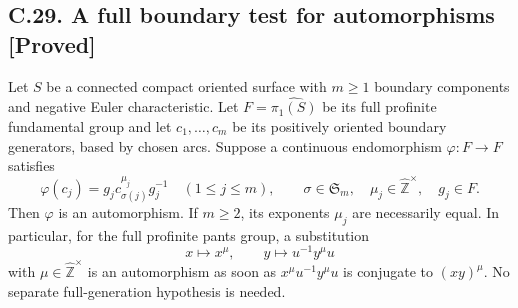 \documentclass[11pt]{article}
\newcommand{\statement}[3]{\subsection*{#1. #3 [#2]}}
\begin{document}
\statement{C.29}{Proved}{A full boundary test for automorphisms}
Let $S$ be a connected compact oriented surface with $m\geq1$ boundary components and negative Euler characteristic. Let $F=\widehat{\pi_1(S)}$ be its full profinite fundamental group and let $c_1,\ldots,c_m$ be its positively oriented boundary generators, based by chosen arcs. Suppose a continuous endomorphism $\varphi:F\to F$ satisfies
\[
 \varphi(c_j)=g_jc_{\sigma(j)}^{\mu_j}g_j^{-1}
 \quad(1\leq j\leq m),
 \qquad \sigma\in\mathfrak S_m,\quad
 \mu_j\in\widehat{\mathbb Z}^{\times},\quad g_j\in F.
\]
Then $\varphi$ is an automorphism. If $m\geq2$, its exponents $\mu_j$ are necessarily equal. In particular, for the full profinite pants group, a substitution
\[
 x\longmapsto x^\mu,\qquad y\longmapsto u^{-1}y^\mu u
\]
with $\mu\in\widehat{\mathbb Z}^{\times}$ is an automorphism as soon as $x^\mu u^{-1}y^\mu u$ is conjugate to $(xy)^\mu$. No separate full-generation hypothesis is needed.
\end{document}
